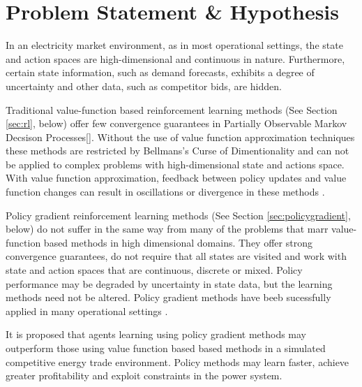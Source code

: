 \section{Problem Statement \& Hypothesis}%
In an electricity market environment, as in most operational settings, the
state and action spaces are high-dimensional and continuous in nature.
Furthermore, certain state information, such as demand forecasts, exhibits a
degree of uncertainty and other data, such as competitor bids, are hidden.

Traditional value-function based reinforcement learning methods (See Section
\ref{sec:rl}, below) offer few convergence guarantees in Partially Observable
Markov Decsison Processes[].  Without the use of value function approximation
techniques these methods are restricted by Bellmans's Curse of Dimentionality
and can not be applied to complex problems with high-dimensional state and
actions space.  With value function approximation, feedback between policy
updates and value function changes can result in oscillations or divergence in
these methods \cite{peters:enac}.

Policy gradient reinforcement learning methods (See Section
\ref{sec:policygradient}, below) do not suffer in the same way from many of the
problems that marr value-function based methods in high dimensional domains.
They offer strong convergence guarantees, do not require that all states are
visited and work with state and action spaces that are continuous, discrete or
mixed.  Policy performance may be degraded by uncertainty in state data, but
the learning methods need not be altered.  Policy gradient methods have beeb
sucessfully applied in many operational settings
\cite{barto:policy,shaal:robots,moody:direct,peshkin:routing}.

It is proposed that agents learning using policy gradient methods may
outperform those using value function based based methods in a simulated
competitive energy trade environment.  Policy methods may learn faster, achieve
greater profitability and exploit constraints in the power system.



